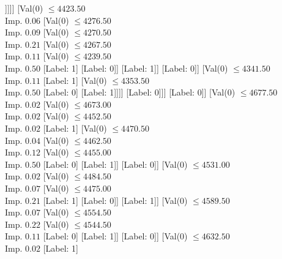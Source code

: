 \documentclass[margin=10pt]{standalone}
\begin{document}
\begin{forest}
											[Label: 1]
											[Val($0$) $ \leq 4386.00$ \\ Imp. $0.12$
												[Label: 0]
												[Val($0$) $ \leq 4401.00$ \\ Imp. $0.50$
													[Label: 1]
													[Label: 0]]]]]
									[Val($0$) $ \leq 4423.50$ \\ Imp. $0.06$
										[Val($0$) $ \leq 4276.50$ \\ Imp. $0.09$
											[Val($0$) $ \leq 4270.50$ \\ Imp. $0.21$
												[Val($0$) $ \leq 4267.50$ \\ Imp. $0.11$
													[Val($0$) $ \leq 4239.50$ \\ Imp. $0.50$
														[Label: 1]
														[Label: 0]]
													[Label: 1]]
												[Label: 0]]
											[Val($0$) $ \leq 4341.50$ \\ Imp. $0.11$
												[Label: 1]
												[Val($0$) $ \leq 4353.50$ \\ Imp. $0.50$
													[Label: 0]
													[Label: 1]]]]
										[Label: 0]]]
								[Label: 0]]
							[Val($0$) $ \leq 4677.50$ \\ Imp. $0.02$
								[Val($0$) $ \leq 4673.00$ \\ Imp. $0.02$
									[Val($0$) $ \leq 4452.50$ \\ Imp. $0.02$
										[Label: 1]
										[Val($0$) $ \leq 4470.50$ \\ Imp. $0.04$
											[Val($0$) $ \leq 4462.50$ \\ Imp. $0.12$
												[Val($0$) $ \leq 4455.00$ \\ Imp. $0.50$
													[Label: 0]
													[Label: 1]]
												[Label: 0]]
											[Val($0$) $ \leq 4531.00$ \\ Imp. $0.02$
												[Val($0$) $ \leq 4484.50$ \\ Imp. $0.07$
													[Val($0$) $ \leq 4475.00$ \\ Imp. $0.21$
														[Label: 1]
														[Label: 0]]
													[Label: 1]]
												[Val($0$) $ \leq 4589.50$ \\ Imp. $0.07$
													[Val($0$) $ \leq 4554.50$ \\ Imp. $0.22$
														[Val($0$) $ \leq 4544.50$ \\ Imp. $0.11$
															[Label: 0]
															[Label: 1]]
														[Label: 0]]
													[Val($0$) $ \leq 4632.50$ \\ Imp. $0.02$
														[Label: 1]

\end{forest}
\end{document}
